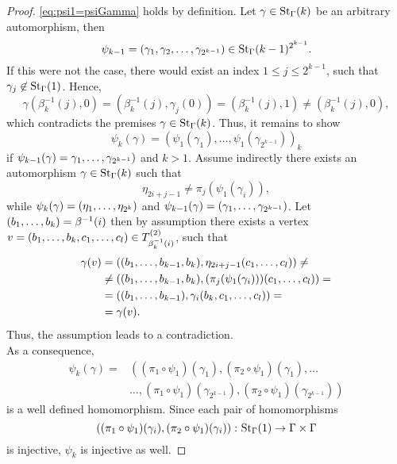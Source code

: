 \begin{proof}
\cref{eq:psi1=psiGamma} holds by definition. Let $\gamma\in\St[\Gamma]{k}$ be an arbitrary automorphism, then 
\begin{equation*}
\psi_{k-1}=(\gamma_1,\gamma_2,\ldots,\gamma_{2^{k-1}})\in\St[\Gamma]{k-1}^{2^{k-1}}.
\end{equation*}
If this were not the case, there would exist an index $1\leq j\leq 2^{k-1}$, such that $\gamma_j\not\in\St[\Gamma]{1}$. Hence, 
\begin{equation*}
\gamma(\beta_k^{-1}(j),0)=(\beta_k^{-1}(j),\gamma_j(0))=(\beta_k^{-1}(j),1)\neq(\beta_k^{-1}(j),0),
\end{equation*}
which contradicts the premises $\gamma\in\St[\Gamma]{k}$. Thus, it remains to show
\begin{equation*}
\psi_k(\gamma)=(\psi_1(\gamma_1),\ldots,\psi_1(\gamma_{2^{k-1}}))_k
\end{equation*}
if $\psi_{k-1}(\gamma)=\seq[2^{k-1}]{\gamma})$ and $k>1$. Assume indirectly there exists an automorphism $\gamma\in\St[\Gamma]{k}$ such that
\begin{equation*}
\eta_{2i+j-1}\neq\pi_j(\psi_1(\gamma_i)),
\end{equation*}
while $\psi_k(\gamma)=(\seq[2^k]{\eta})$ and $\psi_{k-1}(\gamma)=(\seq[2^{k-1}]{\gamma})$. Let $(\seq[k]{b})=\beta^{-1}(i)$ then by assumption there exists a vertex $v=(\seq[k]{b},\seq[l]{c})\in\ST{\beta_k^{-1}(i)}$, such that
\begin{align*}
\gamma(v)	&=		((\seq[k-1]{b},b_k),\eta_{2i+j-1}(\seq[l]{c}))\neq\\
			&\neq	((\seq[k-1]{b},b_k),(\pi_j(\psi_1(\gamma_i)))(\seq[l]{c}))=\\
			&=		((\seq[k-1]{b}),\gamma_i(b_k,\seq[l]{c}))=\\
			&=		\gamma(v).
\end{align*}
Thus, the assumption leads to a contradiction.\\
As a consequence, 
\begin{align*}
\psi_k(\gamma)=&\left((\pi_1\circ\psi_1)(\gamma_1),(\pi_2\circ\psi_1)(\gamma_1),\ldots\right.\\
	&\left.\ldots,(\pi_1\circ\psi_1)(\gamma_{2^{k-1}}),(\pi_2\circ\psi_1)(\gamma_{2^{k-1}})\right)
\end{align*}
is a well defined homomorphism. Since each pair of homomorphisms 
\begin{equation*}
\left((\pi_1\circ\psi_1)(\gamma_i),(\pi_2\circ\psi_1)(\gamma_i)\right)\colon\St[\Gamma]{1}\to\Gamma\times\Gamma
\end{equation*}
is injective, $\psi_k$ is injective as well.
\end{proof}
